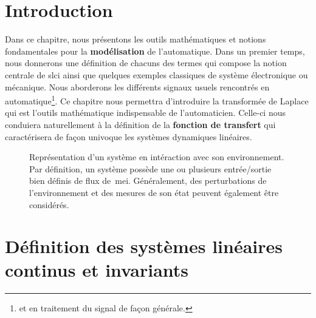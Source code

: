 \section{Introduction}
Dans ce chapitre, nous présentons les outils mathématiques 
et notions fondamentales pour la \textbf{modélisation} de l'automatique.
Dans un premier temps, nous donnerons une définition de chacuns 
des termes qui compose la notion centrale de \gls{slci} ainsi que quelques
exemples classiques de système électronique ou mécanique.
Nous aborderons les différents signaux usuels rencontrés
en automatique\footnote{et en traitement du signal de façon générale.}.
Ce chapitre nous permettra d'introduire la transformée de Laplace qui 
est l'outils mathématique indispensable de l'automaticien.
Celle-ci nous conduiera naturellement à la définition 
de la \textbf{fonction de transfert} qui caractérisera de façon univoque 
les systèmes dynamiques linéaires.
\begin{figure}[!h]
    \centering
    
    \caption{Représentation d'un système en intéraction avec son environnement. 
             Par définition, un système possède une ou plusieurs entrée/sortie 
             bien définis de flux de~\gls{mei}. Généralement, des 
             perturbations de l'environnement et des mesures de son état 
             peuvent également être considérés.\label{fig-systeme}}
\end{figure}
\newpage
{}
\section[Définition SLCI]
        {Définition des systèmes linéaires continus et invariants}
